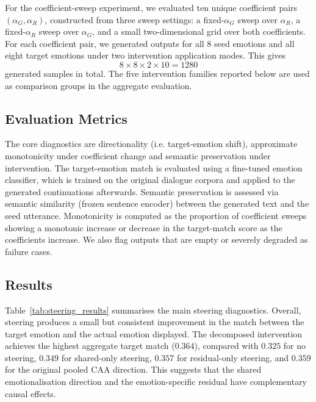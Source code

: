 For the coefficient-sweep experiment, we evaluated ten unique coefficient pairs $(\alpha_G,\alpha_R)$, constructed from three sweep settings: a fixed-$\alpha_G$ sweep over $\alpha_R$, a fixed-$\alpha_R$ sweep over $\alpha_G$, and a small two-dimensional grid over both coefficients. For each coefficient pair, we generated outputs for all 8 seed emotions and all eight target emotions under two intervention application modes. This gives \[ 8 \times 8 \times 2 \times 10 = 1280 \] generated samples in total. The five intervention families reported below are used as comparison groups in the aggregate evaluation.

\subsection*{Evaluation Metrics}

The core diagnostics are directionality (i.e. target-emotion shift), approximate monotonicity under coefficient change and semantic preservation under intervention. The target-emotion match is evaluated using a fine-tuned emotion classifier, which is trained on the original dialogue corpora and applied to the generated continuations afterwards. Semantic preservation is assessed via semantic similarity (frozen sentence encoder) between the generated text and the seed utterance. Monotonicity is computed as the proportion of coefficient sweeps showing a monotonic increase or decrease in the target-match score as the coefficients increase. We also flag outputs that are empty or severely degraded as failure cases.

\subsection*{Results}

Table~\ref{tab:steering_results} summarises the main steering diagnostics. Overall, steering produces a small but consistent improvement in the match between the target emotion and the actual emotion displayed. The decomposed intervention achieves the highest aggregate target match ($0.364$), compared with $0.325$ for no steering, $0.349$ for shared-only steering, $0.357$ for residual-only steering, and $0.359$ for the original pooled CAA direction. This suggests that the shared emotionalisation direction and the emotion-specific residual have complementary causal effects.\par

